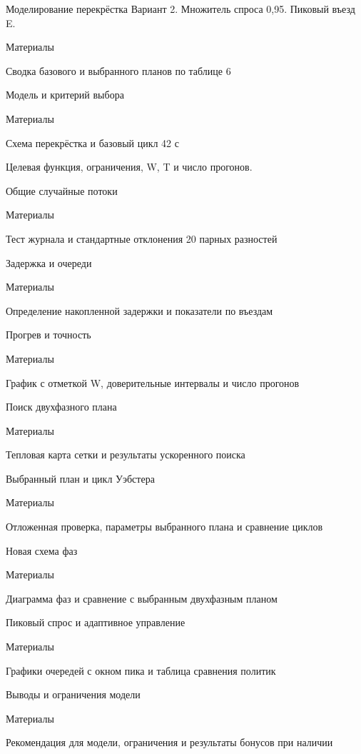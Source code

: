 \documentclass[aspectratio=169]{beamer}
\date{}
\newcommand{\evidence}[1]{\begin{block}{Материалы}\parbox[c][24mm][c]{\linewidth}{\centering #1}\end{block}}
\begin{document}
\begin{frame}{Моделирование перекрёстка}
Вариант 2. Множитель спроса 0,95. Пиковый въезд E.
\evidence{Сводка базового и выбранного планов по таблице 6}
\end{frame}
\begin{frame}{Модель и критерий выбора}
\evidence{Схема перекрёстка и базовый цикл 42 с}
Целевая функция, ограничения, W, T и число прогонов.
\end{frame}
\begin{frame}{Общие случайные потоки}
\evidence{Тест журнала и стандартные отклонения 20 парных разностей}
\end{frame}
\begin{frame}{Задержка и очереди}
\evidence{Определение накопленной задержки и показатели по въездам}
\end{frame}
\begin{frame}{Прогрев и точность}
\evidence{График с отметкой W, доверительные интервалы и число прогонов}
\end{frame}
\begin{frame}{Поиск двухфазного плана}
\evidence{Тепловая карта сетки и результаты ускоренного поиска}
\end{frame}
\begin{frame}{Выбранный план и цикл Уэбстера}
\evidence{Отложенная проверка, параметры выбранного плана и сравнение циклов}
\end{frame}
\begin{frame}{Новая схема фаз}
\evidence{Диаграмма фаз и сравнение с выбранным двухфазным планом}
\end{frame}
\begin{frame}{Пиковый спрос и адаптивное управление}
\evidence{Графики очередей с окном пика и таблица сравнения политик}
\end{frame}
\begin{frame}{Выводы и ограничения модели}
\evidence{Рекомендация для модели, ограничения и результаты бонусов при наличии}
\end{frame}
\end{document}
